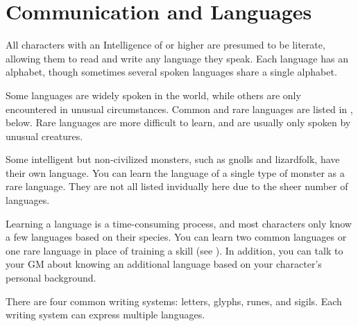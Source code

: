 \section{Communication and Languages}\label{Languages}\label{Communication and Languages}

  All characters with an Intelligence of  or higher are presumed to be literate, allowing them to read and write any language they speak. Each language has an alphabet, though sometimes several spoken languages share a single alphabet.

  Some languages are widely spoken in the world, while others are only encountered in unusual circumstances.
  Common and rare languages are listed in , below.
  Rare languages are more difficult to learn, and are usually only spoken by unusual creatures.

  Some intelligent but non-civilized monsters, such as gnolls and lizardfolk, have their own language.
  You can learn the language of a single type of monster as a rare language.
  They are not all listed invidually here due to the sheer number of languages.

  Learning a language is a time-consuming process, and most characters only know a few languages based on their species.
  You can learn two common languages or one rare language in place of training a skill (see ).
  In addition, you can talk to your GM about knowing an additional language based on your character's personal background.

  There are four common writing systems: letters, glyphs, runes, and sigils.
  Each writing system can express multiple languages.

